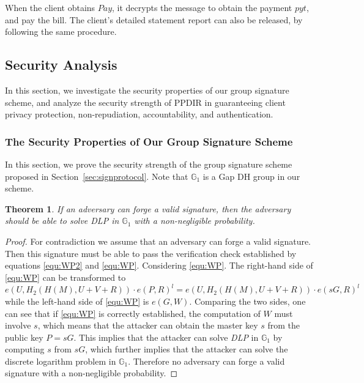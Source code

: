 \documentclass[letterpaper,12pt]{article}
\newtheorem{theorem}{Theorem}
\begin{document}
When the client obtains $Pay$, it decrypts the message to obtain the payment $pyt$, and pay the bill.
%
The client's detailed statement report can also be released, by following the same procedure.




\subsection{Security Analysis}\label{sec:SecurityAnalysis}
In this section, we investigate the security properties of our group signature scheme, and analyze the security strength of PPDIR in guaranteeing client privacy protection, non-repudiation, accountability, and authentication.


\subsubsection{The Security Properties of Our Group Signature Scheme}\label{sec:sec:security_strength}
In this section, we prove the security strength of the group signature scheme proposed in Section~\ref{sec:signprotocol}. Note that $\mathbb{G}_1$ is a Gap DH group in our scheme.

\begin{theorem}\label{sec:sec:security_resist_fake}
If an adversary can forge a valid signature, then the adversary should be able to solve DLP in $\mathbb{G}_1$ with a non-negligible probability.
\end{theorem}
\begin{proof} For contradiction we assume that an adversary can forge a valid signature. Then this signature must be able to pass the verification  check established by equations \eqref{equ:WP2} and \eqref{equ:WP}. Considering \eqref{equ:WP}. The right-hand side of \eqref{equ:WP} can be transformed to $e(U, H_2(H(M), U+V+R))\cdot e(P, R)^{l}=e(U, H_2(H(M), U+V+R))\cdot e(sG, R)^{l}$ while the left-hand side of \eqref{equ:WP} is $e(G, W)$. Comparing the two sides, one can see that if  \eqref{equ:WP} is correctly established, the computation of $W$ must involve $s$, which means that the attacker can obtain the master key $s$ from the public key $P=sG$. This implies that the attacker can solve \emph{DLP} in $\mathbb{G}_1$ by computing $s$ from $sG$, which further implies that the attacker can solve the discrete logarithm problem in $\mathbb{G}_1$. %
Therefore no adversary can forge a valid signature with a non-negligible probability.
\end{proof}
\end{document}
